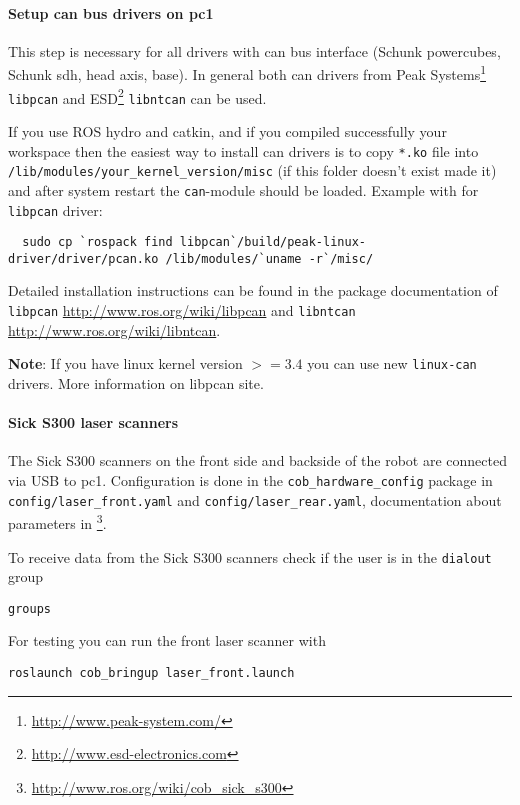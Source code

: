 \paragraph{Setup can bus drivers on pc1}
This step is necessary for all drivers with can bus interface (Schunk powercubes, Schunk sdh, head axis, base). In general both can drivers from Peak Systems\footnote{\url{http://www.peak-system.com/}} \texttt{libpcan} and ESD\footnote{\url{http://www.esd-electronics.com}} \texttt{libntcan} can be used.

If you use ROS hydro and catkin, and if you compiled successfully your workspace then the easiest way to install can drivers is to copy \texttt{*.ko} file into \texttt{/lib/modules/your\_kernel\_version/misc} (if this folder doesn't exist made it) and after system restart the \texttt{can}-module should be loaded. Example with  for \texttt{libpcan} driver:
\begin{lstlisting}
  sudo cp `rospack find libpcan`/build/peak-linux-driver/driver/pcan.ko /lib/modules/`uname -r`/misc/
\end{lstlisting}
Detailed installation instructions can be found in the package documentation of \texttt{libpcan} \url{http://www.ros.org/wiki/libpcan} and \texttt{libntcan} \url{http://www.ros.org/wiki/libntcan}.

\textbf{Note}: If you have linux kernel version $>= 3.4$ you can use new \texttt{linux-can} drivers. More information on libpcan site.

\paragraph{Sick S300 laser scanners}
The Sick S300 scanners on the front side and backside of the robot are connected via USB to pc1. Configuration is done in the \texttt{cob\_hardware\_config} package in \texttt{config/laser\_front.yaml} and \texttt{config/laser\_rear.yaml}, documentation about parameters in \footnote{\url{http://www.ros.org/wiki/cob_sick_s300}}.

To receive data from the Sick S300 scanners check if the user is in the \texttt{dialout} group
\begin{lstlisting}
groups
\end{lstlisting}

For testing you can run the front laser scanner with
\begin{lstlisting}
roslaunch cob_bringup laser_front.launch
\end{lstlisting}

